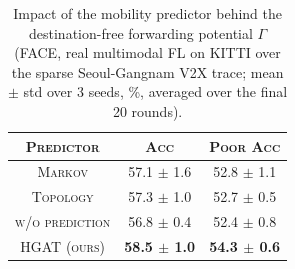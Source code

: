 \begin{table}[t]
    \centering
    \caption{Impact of the mobility predictor behind the destination-free forwarding potential $\Gamma$ (FACE, real multimodal FL on KITTI over the sparse Seoul-Gangnam V2X trace; mean $\pm$ std over 3 seeds, \%, averaged over the final 20 rounds).}
    \label{tab:mobpred}
    \renewcommand{\arraystretch}{1.15}
    \setlength{\tabcolsep}{4.5pt}
    \begin{tabular}{c|c|c}
        \hline
        \textsc{Predictor} & \textsc{Acc} & \textsc{Poor Acc} \\
        \hline
        \textsc{Markov} & 57.1 $\pm$ 1.6 & 52.8 $\pm$ 1.1 \\
        \textsc{Topology} & 57.3 $\pm$ 1.0 & 52.7 $\pm$ 0.5 \\
        \textsc{w/o prediction} & 56.8 $\pm$ 0.4 & 52.4 $\pm$ 0.8 \\
        \hline
        \textsc{HGAT (ours)} & \textbf{58.5 $\pm$ 1.0} & \textbf{54.3 $\pm$ 0.6} \\
        \hline
    \end{tabular}
\end{table}

